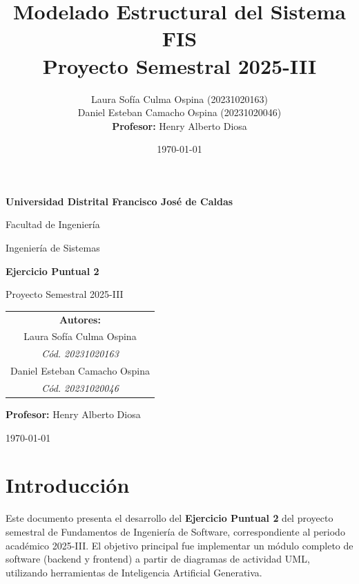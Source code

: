 \documentclass[11pt,a4paper]{article}
\title{Modelado Estructural del Sistema FIS\\
\Large Proyecto Semestral 2025-III}
\author{Laura Sofía Culma Ospina (20231020163)\\
Daniel Esteban Camacho Ospina (20231020046)\\
\textbf{Profesor:} Henry Alberto Diosa}
\date{\today}
\begin{document}
\begin{titlepage}
    \centering
    \vspace*{1cm}
    
    {\LARGE \bfseries Universidad Distrital Francisco José de Caldas}
    \vspace{0.3cm}
    
    {\LARGE Facultad de Ingeniería}
    \vspace{0.3cm}
    
    {\large Ingeniería de Sistemas}
    
    \vspace{2.5cm}
    
    {\huge \bfseries Ejercicio Puntual 2}
    \vspace{0.5cm}
    
    {\huge Proyecto Semestral 2025-III}
    
    \vspace{3cm}
    
    \begin{tabular}{c}
        \Large \textbf{Autores:}\\[0.5cm]
        Laura Sofía Culma Ospina\\
        \textit{Cód. 20231020163}\\[0.5cm]
        Daniel Esteban Camacho Ospina\\
        \textit{Cód. 20231020046}
    \end{tabular}
    
    \vspace{2.5cm}
    
    {\large \textbf{Profesor:} Henry Alberto Diosa}
    
    \vspace{3cm}
    
    {\large \today}
\end{titlepage}

\newpage
\tableofcontents
\newpage

\section{Introducción}

Este documento presenta el desarrollo del \textbf{Ejercicio Puntual 2} del proyecto semestral de Fundamentos de Ingeniería de Software, correspondiente al periodo académico 2025-III. El objetivo principal fue implementar un módulo completo de software (backend y frontend) a partir de diagramas de actividad UML, utilizando herramientas de Inteligencia Artificial Generativa.
\end{document}
